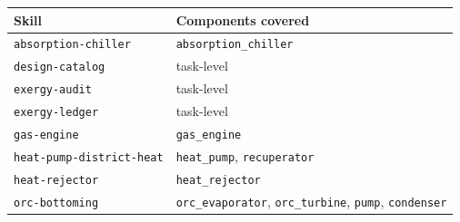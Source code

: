 \begingroup\small\renewcommand{\arraystretch}{1.12}
\begin{tabular}{@{}ll@{}}
\toprule
Skill & Components covered \\
\midrule
\texttt{absorption-chiller} & \texttt{absorption\_chiller} \\
\texttt{design-catalog} & task-level \\
\texttt{exergy-audit} & task-level \\
\texttt{exergy-ledger} & task-level \\
\texttt{gas-engine} & \texttt{gas\_engine} \\
\texttt{heat-pump-district-heat} & \texttt{heat\_pump}, \texttt{recuperator} \\
\texttt{heat-rejector} & \texttt{heat\_rejector} \\
\texttt{orc-bottoming} & \texttt{orc\_evaporator}, \texttt{orc\_turbine}, \texttt{pump}, \texttt{condenser} \\
\bottomrule
\end{tabular}\endgroup
